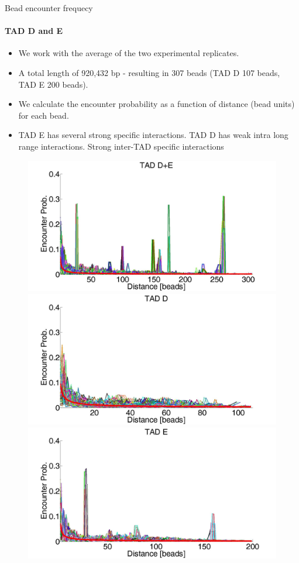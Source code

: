 \documentclass[8pt]{beamer}
\begin{document}
\begin{frame}{Bead encounter frequecy}
\framesubtitle{TAD D and E}
\begin{itemize}
\item We work with the average of the two experimental replicates.
\item A total length of 920,432 bp - resulting in 307 beads (TAD D 107 beads, TAD E 200 beads).
\item We calculate the encounter probability as a function of distance (bead units) for each bead.
\item TAD E has several strong specific interactions. TAD D has weak intra long range interactions. Strong inter-TAD specific interactions
\end{itemize}

\begin{figure}[H]\label{TADDAndEencounterProb}
\centering
\includegraphics[scale=0.078]{encounterProbabilityTADDAndE}
\includegraphics[scale=0.075]{encounterProbabilityTADD}
\includegraphics[scale=0.075]{encounterProbabilityTADE}
\end{figure}
\end{frame}
\end{document}
